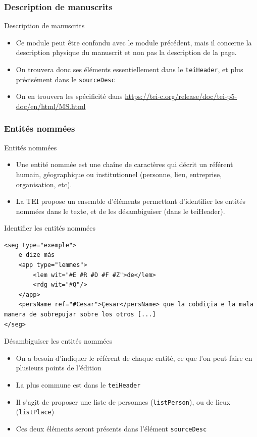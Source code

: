 \documentclass[11pt,aspectratio=1610]{beamer}
\begin{document}
\subsubsection{Description de manuscrits}
\begin{frame}{Description de manuscrits}
\begin{itemize}
\item Ce module peut être confondu avec le module précédent, mais il concerne la description physique du manuscrit et non pas la description de la page. 
\item On trouvera donc ses éléments essentiellement dans le \texttt{teiHeader}, et plus précisément dans le \texttt{sourceDesc}
\item On en trouvera les spécificité dans \href{https://tei-c.org/release/doc/tei-p5-doc/en/html/MS.html}{https://tei-c.org/release/doc/tei-p5-doc/en/html/MS.html}
\end{itemize}
\end{frame}


\subsubsection{Entités nommées}
\begin{frame}{Entités nommées}
\begin{itemize}
\item Une entité nommée est une chaîne de caractères qui décrit un référent humain, géographique ou institutionnel (personne, lieu, entreprise, organisation, etc). 
\item La TEI propose un ensemble d'éléments permettant d'identifier les entités nommées dans le texte, et de les désambiguiser (dans le teiHeader).
\end{itemize}
\end{frame}


\begin{frame}[containsverbatim]{Identifier les entités nommées}
\begin{verbatim}
<seg type="exemple">
    e dize más
    <app type="lemmes">
        <lem wit="#E #R #D #F #Z">de</lem>
        <rdg wit="#Q"/>
    </app>
    <persName ref="#Cesar">Çesar</persName> que la cobdiçia e la mala manera de sobrepujar sobre los otros [...]
</seg>
\end{verbatim}
\end{frame}

\begin{frame}{Désambiguiser les entités nommées}
\begin{itemize}
\item On a besoin d'indiquer le référent de chaque entité, ce que l'on peut faire en plusieurs points de l'édition
\item La plus commune est dans le \texttt{teiHeader}
\item Il s'agit de proposer une liste de personnes (\texttt{listPerson}), ou de lieux (\texttt{listPlace})
\item Ces deux éléments seront présents dans l'élément \texttt{sourceDesc}
\end{itemize}
\end{frame}
\end{document}
